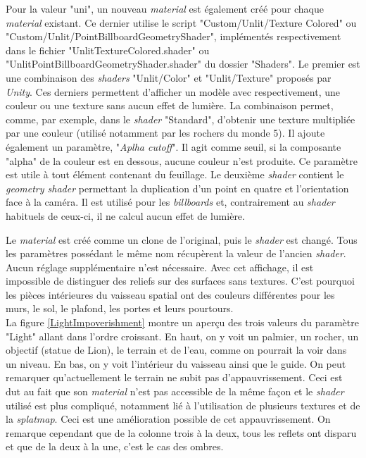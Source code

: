 		Pour la valeur "uni", un nouveau \textit{material} est également créé pour chaque \textit{material} existant. Ce dernier utilise le script "Custom/Unlit/Texture Colored" ou "Custom/Unlit/PointBillboardGeometryShader", implémentés respectivement dans le fichier "UnlitTextureColored.shader" ou "UnlitPointBillboardGeometryShader.shader" du dossier "Shaders". Le premier est une combinaison des \textit{shaders} "Unlit/Color" et "Unlit/Texture" proposés par \textit{Unity}. Ces derniers permettent d'afficher un modèle avec respectivement, une couleur ou une texture sans aucun effet de lumière. La combinaison permet, comme, par exemple, dans le \textit{shader} "Standard", d'obtenir une texture multipliée par une couleur (utilisé notamment par les rochers du monde 5). Il ajoute également un paramètre, "\textit{Aplha cutoff}". Il agit comme seuil, si la composante "alpha" de la couleur est en dessous, aucune couleur n'est produite. Ce paramètre est utile à tout élément contenant du feuillage. Le deuxième \textit{shader} contient le \textit{geometry shader} permettant la duplication d'un point en quatre et l'orientation face à la caméra. Il est utilisé pour les \textit{billboards} et, contrairement au \textit{shader} habituels de ceux-ci, il ne calcul aucun effet de lumière.
		
		Le \textit{material} est créé comme un clone de l'original, puis le \textit{shader} est changé. Tous les paramètres possédant le même nom récupèrent la valeur de l'ancien \textit{shader}. Aucun réglage supplémentaire n'est nécessaire. Avec cet affichage, il est impossible de distinguer des reliefs sur des surfaces sans textures. C'est pourquoi les pièces intérieures du vaisseau spatial ont des couleurs différentes pour les murs, le sol, le plafond, les portes et leurs pourtours.
		\\
		
		La figure \ref{LightImpoverishment} montre un aperçu des trois valeurs du paramètre "Light" allant dans l'ordre croissant. En haut, on y voit un palmier, un rocher, un objectif (statue de Lion), le terrain et de l'eau, comme on pourrait la voir dans un niveau. En bas, on y voit l'intérieur du vaisseau ainsi que le guide. On peut remarquer qu'actuellement le terrain ne subit pas d'appauvrissement. Ceci est dut au fait que son \textit{material} n'est pas accessible de la même façon et le \textit{shader} utilisé est plus compliqué, notamment lié à l'utilisation de plusieurs textures et de la \textit{splatmap}. Ceci est une amélioration possible de cet appauvrissement. On remarque cependant que de la colonne trois à la deux, tous les reflets ont disparu et que de la deux à la une, c'est le cas des ombres.\medskip
		
